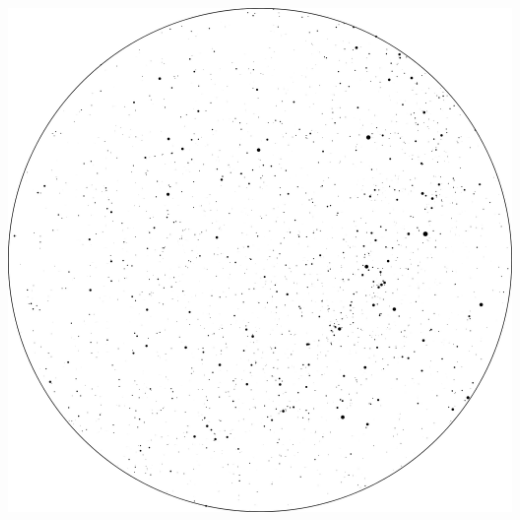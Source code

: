 \documentclass{SAS-class-skygen}
\begin{document}
	\vspace{0.5cm}
    \begin{center}
    \includegraphics[width=\textwidth]{./pics/sky_chart8.png}
    \end{center}
    
    
\end{document}
